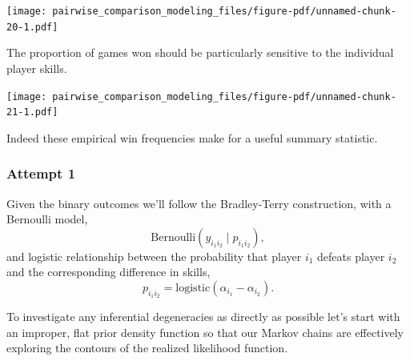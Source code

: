\documentclass[
  letterpaper,
  DIV=11,
  numbers=noendperiod]{scrartcl}
\newenvironment{Shaded}{\begin{snugshade}}{\end{snugshade}}
\newcommand{\AttributeTok}[1]{\textcolor[rgb]{0.40,0.45,0.13}{#1}}
\newcommand{\DecValTok}[1]{\textcolor[rgb]{0.68,0.00,0.00}{#1}}
\newcommand{\FunctionTok}[1]{\textcolor[rgb]{0.28,0.35,0.67}{#1}}
\newcommand{\NormalTok}[1]{\textcolor[rgb]{0.00,0.23,0.31}{#1}}
\newcommand{\SpecialCharTok}[1]{\textcolor[rgb]{0.37,0.37,0.37}{#1}}
\newcommand{\StringTok}[1]{\textcolor[rgb]{0.13,0.47,0.30}{#1}}
\begin{document}
\texttt{[image: pairwise\_comparison\_modeling\_files/figure-pdf/unnamed-chunk-20-1.pdf]}

The proportion of games won should be particularly sensitive to the
individual player skills.

\begin{Shaded}
\end{Shaded}

\texttt{[image: pairwise\_comparison\_modeling\_files/figure-pdf/unnamed-chunk-21-1.pdf]}

Indeed these empirical win frequencies make for a useful summary
statistic.

\subsubsection{Attempt 1}\label{attempt-1}

Given the binary outcomes we'll follow the Bradley-Terry construction,
with a Bernoulli model, \[
\text{Bernoulli}(y_{i_{1} i_{2}} \mid p_{i_{1} i_{2}}),
\] and logistic relationship between the probability that player
\(i_{1}\) defeats player \(i_{2}\) and the corresponding difference in
skills, \[
p_{i_{1} i_{2}}
=
\mathrm{logistic}(\alpha_{i_{1}} - \alpha_{i_{2}}).
\]

To investigate any inferential degeneracies as directly as possible
let's start with an improper, flat prior density function so that our
Markov chains are effectively exploring the contours of the realized
likelihood function.
\end{document}
